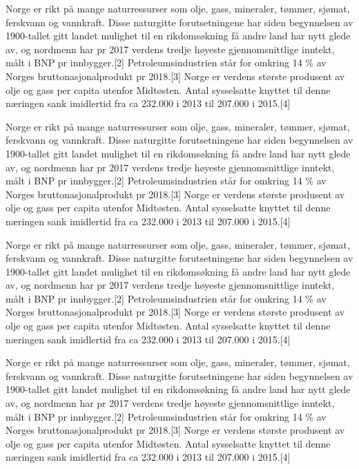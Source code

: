 \documentclass{book}
\begin{document}
Norge er rikt på mange naturressurser som olje, gass, mineraler, tømmer, sjømat, ferskvann og vannkraft. Disse naturgitte forutsetningene har siden begynnelsen av 1900-tallet gitt landet mulighet til en rikdomsøkning få andre land har nytt glede av, og nordmenn har pr 2017 verdens tredje høyeste gjennomsnittlige inntekt, målt i BNP pr innbygger.[2] Petroleumsindustrien står for omkring 14 \% av Norges bruttonasjonalprodukt pr 2018.[3] Norge er verdens største produsent av olje og gass per capita utenfor Midtøsten. Antal sysselsatte knyttet til denne næringen sank imidlertid fra ca 232.000 i 2013 til 207.000 i 2015.[4]

Norge er rikt på mange naturressurser som olje, gass, mineraler, tømmer, sjømat, ferskvann og vannkraft. Disse naturgitte forutsetningene har siden begynnelsen av 1900-tallet gitt landet mulighet til en rikdomsøkning få andre land har nytt glede av, og nordmenn har pr 2017 verdens tredje høyeste gjennomsnittlige inntekt, målt i BNP pr innbygger.[2] Petroleumsindustrien står for omkring 14 \% av Norges bruttonasjonalprodukt pr 2018.[3] Norge er verdens største produsent av olje og gass per capita utenfor Midtøsten. Antal sysselsatte knyttet til denne næringen sank imidlertid fra ca 232.000 i 2013 til 207.000 i 2015.[4]

Norge er rikt på mange naturressurser som olje, gass, mineraler, tømmer, sjømat, ferskvann og vannkraft. Disse naturgitte forutsetningene har siden begynnelsen av 1900-tallet gitt landet mulighet til en rikdomsøkning få andre land har nytt glede av, og nordmenn har pr 2017 verdens tredje høyeste gjennomsnittlige inntekt, målt i BNP pr innbygger.[2] Petroleumsindustrien står for omkring 14 \% av Norges bruttonasjonalprodukt pr 2018.[3] Norge er verdens største produsent av olje og gass per capita utenfor Midtøsten. Antal sysselsatte knyttet til denne næringen sank imidlertid fra ca 232.000 i 2013 til 207.000 i 2015.[4]

Norge er rikt på mange naturressurser som olje, gass, mineraler, tømmer, sjømat, ferskvann og vannkraft. Disse naturgitte forutsetningene har siden begynnelsen av 1900-tallet gitt landet mulighet til en rikdomsøkning få andre land har nytt glede av, og nordmenn har pr 2017 verdens tredje høyeste gjennomsnittlige inntekt, målt i BNP pr innbygger.[2] Petroleumsindustrien står for omkring 14 \% av Norges bruttonasjonalprodukt pr 2018.[3] Norge er verdens største produsent av olje og gass per capita utenfor Midtøsten. Antal sysselsatte knyttet til denne næringen sank imidlertid fra ca 232.000 i 2013 til 207.000 i 2015.[4]
\end{document}
